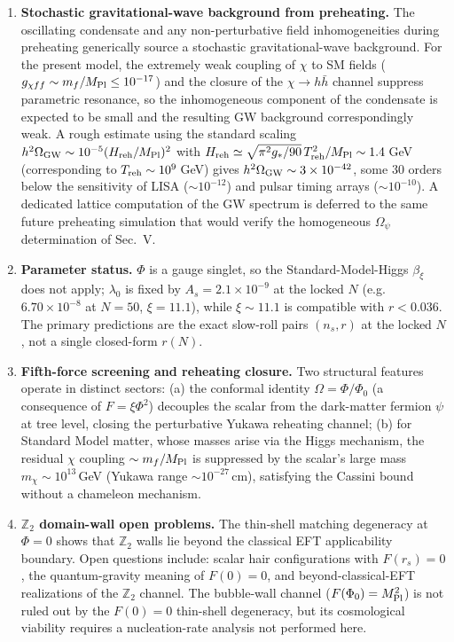 \documentclass[pdflatex,sn-mathphys-num]{sn-jnl}
\newcommand{\MP}{M_{\rm Pl}}
\newcommand{\Ztwo}{\mathbb{Z}_2}
\newcommand{\PhiV}{\Phi_0}
\theoremstyle{thmstyleone}
\begin{document}
\begin{enumerate}
\item \textbf{Stochastic gravitational-wave background from preheating.} The oscillating condensate and any non-perturbative field inhomogeneities during preheating generically source a stochastic gravitational-wave background. For the present model, the extremely weak coupling of $\chi$ to SM fields ($g_{\chi ff}\sim m_f/\MP\leq10^{-17}$) and the closure of the $\chi\to h\bar h$ channel suppress parametric resonance, so the inhomogeneous component of the condensate is expected to be small and the resulting GW background correspondingly weak. A rough estimate using the standard scaling $h^2\Omega_{\rm GW}\sim10^{-5}(H_{\rm reh}/\MP)^2$ with $H_{\rm reh}\simeq\sqrt{\pi^2 g_*/90}\,T_{\rm reh}^2/\MP\sim1.4\,$GeV (corresponding to $T_{\rm reh}\sim10^9\,$GeV) gives $h^2\Omega_{\rm GW}\sim3\times10^{-42}$, some 30 orders below the sensitivity of LISA ($\sim10^{-12}$) and pulsar timing arrays ($\sim10^{-10}$). A dedicated lattice computation of the GW spectrum is deferred to the same future preheating simulation that would verify the homogeneous $\Omega_\psi$ determination of Sec.~V.

\item \textbf{Parameter status.} $\Phi$ is a gauge singlet, so the Standard-Model-Higgs $\beta_\xi$ does not apply; $\lambda_0$ is fixed by $A_s=2.1\times10^{-9}$ at the locked $N$ (e.g.\ $6.70\times10^{-8}$ at $N=50$, $\xi=11.1$), while $\xi\sim11.1$ is compatible with $r<0.036$. The primary predictions are the exact slow-roll pairs $(n_s,r)$ at the locked $N$, not a single closed-form $r(N)$.

\item \textbf{Fifth-force screening and reheating closure.} Two structural features operate in distinct sectors: (a) the conformal identity $\Omega=\Phi/\PhiV$ (a consequence of $F=\xi\Phi^2$) decouples the scalar from the dark-matter fermion $\psi$ at tree level, closing the perturbative Yukawa reheating channel; (b) for Standard Model matter, whose masses arise via the Higgs mechanism, the residual $\chi$ coupling $\sim m_f/\MP$ is suppressed by the scalar's large mass $m_\chi\sim10^{13}\,$GeV (Yukawa range $\sim10^{-27}\,$cm), satisfying the Cassini bound without a chameleon mechanism.

\item \textbf{$\Ztwo$ domain-wall open problems.} The thin-shell matching degeneracy at $\Phi=0$ shows that $\Ztwo$ walls lie beyond the classical EFT applicability boundary. Open questions include: scalar hair configurations with $F(r_s)=0$, the quantum-gravity meaning of $F(0)=0$, and beyond-classical-EFT realizations of the $\Ztwo$ channel. The bubble-wall channel ($F(\PhiV)=\MP^2$) is not ruled out by the $F(0)=0$ thin-shell degeneracy, but its cosmological viability requires a nucleation-rate analysis not performed here.


\end{enumerate}
\end{document}
